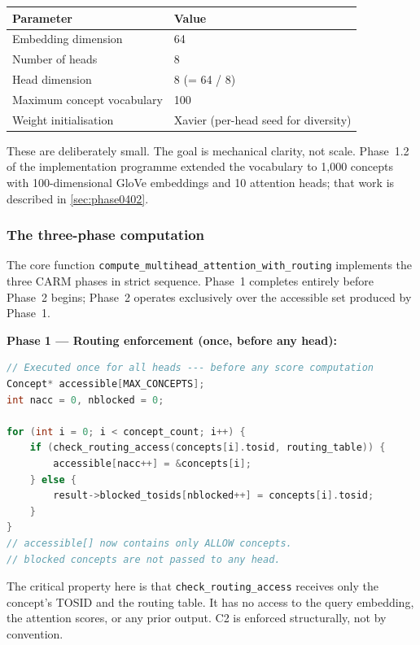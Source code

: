 \documentclass[11pt,a4paper]{article}
\theoremstyle{definition}
\begin{document}
\begin{center}
\begin{tabular}{@{}ll@{}}
\toprule
Parameter & Value \\
\midrule
Embedding dimension & 64 \\
Number of heads & 8 \\
Head dimension & 8 (= 64 / 8) \\
Maximum concept vocabulary & 100 \\
Weight initialisation & Xavier (per-head seed for diversity) \\
\bottomrule
\end{tabular}
\end{center}

These are deliberately small. The goal is mechanical clarity, not scale.
Phase~1.2 of the implementation programme extended the vocabulary to 1,000
concepts with 100-dimensional GloVe embeddings and 10 attention heads; that
work is described in \cref{sec:phase0402}.

\subsubsection{The three-phase computation}

The core function \texttt{compute\_multihead\_attention\_with\_routing}
implements the three CARM phases in strict sequence. Phase~1 completes
entirely before Phase~2 begins; Phase~2 operates exclusively over the
accessible set produced by Phase~1.

\textbf{Phase 1 --- Routing enforcement (once, before any head):}

\begin{lstlisting}[language=C, caption={Phase 1: routing enforcement, query-independent.},
                   label=lst:phase1]
// Executed once for all heads --- before any score computation
Concept* accessible[MAX_CONCEPTS];
int nacc = 0, nblocked = 0;

for (int i = 0; i < concept_count; i++) {
    if (check_routing_access(concepts[i].tosid, routing_table)) {
        accessible[nacc++] = &concepts[i];
    } else {
        result->blocked_tosids[nblocked++] = concepts[i].tosid;
    }
}
// accessible[] now contains only ALLOW concepts.
// blocked concepts are not passed to any head.
\end{lstlisting}

The critical property here is that \texttt{check\_routing\_access} receives
only the concept's TOSID and the routing table. It has no access to the query
embedding, the attention scores, or any prior output. C2 is enforced
structurally, not by convention.
\end{document}
